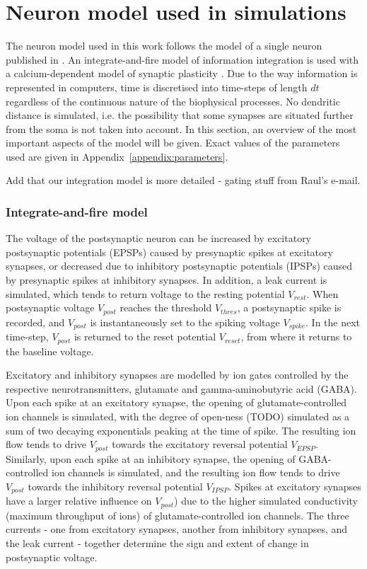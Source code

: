 \documentclass[a4paper,12pt]{report}
\theoremstyle{definition}
\begin{document}
\section{Neuron model used in simulations}

The neuron model used in this work follows the model of a single neuron published in \cite{yeung2004synaptic}. An integrate-and-fire model of information integration is used with a calcium-dependent model of synaptic plasticity \cite{shouval2002unified}. Due to the way information is represented in computers, time is discretised into time-steps of length $dt$ regardless of the continuous nature of the biophysical processes. No dendritic distance is simulated, i.e. the possibility that some synapses are situated further from the soma is not taken into account. In this section, an overview of the most important aspects of the model will be given. Exact values of the parameters used are given in Appendix~\ref{appendix:parameters}.

Add that our integration model is more detailed - gating stuff from Raul's e-mail.


\subsubsection{Integrate-and-fire model}

The voltage of the postsynaptic neuron can be increased by excitatory postsynaptic potentials (EPSPs) caused by presynaptic spikes at excitatory synapses, or decreased due to inhibitory postsynaptic potentials (IPSPs) caused by presynaptic spikes at inhibitory synapses. In addition, a leak current is simulated, which tends to return voltage to the resting potential $V_{rest}$. When postsynaptic voltage $V_{post}$ reaches the threshold $V_{thres}$, a postsynaptic spike is recorded, and $V_{post}$ is instantaneously set to the spiking voltage $V_{spike}$. In the next time-step, $V_{post}$ is returned to the reset potential $V_{reset}$, from where it returns to the baseline voltage.

Excitatory and inhibitory synapses are modelled by ion gates controlled by the respective neurotransmitters, glutamate and gamma-aminobutyric acid (GABA). Upon each spike at an excitatory synapse, the opening of glutamate-controlled ion channels is simulated, with the degree of open-ness (TODO) simulated as a sum of two decaying exponentials peaking at the time of spike. The resulting ion flow tends to drive $V_{post}$ towards the excitatory reversal potential $V_{EPSP}$. Similarly, upon each spike at an inhibitory synapse, the opening of GABA-controlled ion channels is simulated, and the resulting ion flow tends to drive $V_{post}$ towards the inhibitory reversal potential $V_{IPSP}$. Spikes at excitatory synapses have a larger relative influence on $V_{post}$) due to the higher simulated conductivity (maximum throughput of ions) of glutamate-controlled ion channels. The three currents - one from excitatory synapses, another from inhibitory synapses, and the leak current - together determine the sign and extent of change in postsynaptic voltage.
\end{document}
